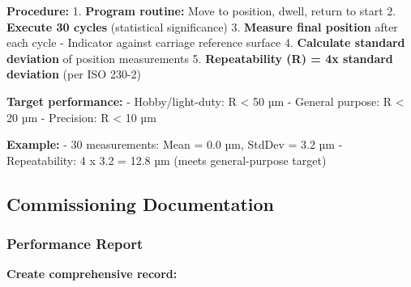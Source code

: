 \documentclass[
]{article}
\begin{document}
\textbf{Procedure:} 1. \textbf{Program routine:} Move to position,
dwell, return to start 2. \textbf{Execute 30 cycles} (statistical
significance) 3. \textbf{Measure final position} after each cycle -
Indicator against carriage reference surface 4. \textbf{Calculate
standard deviation} of position measurements 5. \textbf{Repeatability
(R) = 4x standard deviation} (per ISO 230-2)

\textbf{Target performance:} - Hobby/light-duty: R \textless{} 50 µm -
General purpose: R \textless{} 20 µm - Precision: R \textless{} 10 µm

\textbf{Example:} - 30 measurements: Mean = 0.0 µm, StdDev = 3.2 µm -
Repeatability: 4 x 3.2 = 12.8 µm (meets general-purpose target)

\subsection{Commissioning
Documentation}\label{commissioning-documentation}

\subsubsection{Performance Report}\label{performance-report}

\textbf{Create comprehensive record:}
\end{document}
